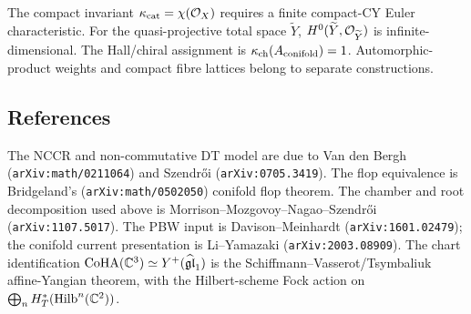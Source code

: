 The compact invariant $\kappa_{\mathrm{cat}}=\chi(\mathcal{O}_X)$ requires a finite compact-CY
Euler characteristic.  For the quasi-projective total space
$\widetilde{Y}$, $H^0(\widetilde{Y},\mathcal{O}_{\widetilde{Y}})$ is
infinite-dimensional.  The Hall/chiral assignment is
$\kappa_{\mathrm{ch}}(A_{\mathrm{conifold}})=1$.  Automorphic-product weights and
compact fibre lattices belong to separate constructions.

\subsection*{References}

The NCCR and non-commutative DT model are due to Van den Bergh
(\texttt{arXiv:math/0211064}) and Szendr\H{o}i
(\texttt{arXiv:0705.3419}).  The flop equivalence is Bridgeland's
(\texttt{arXiv:math/0502050}) conifold flop theorem.  The chamber and
root decomposition used above is Morrison--Mozgovoy--Nagao--Szendr\H{o}i
(\texttt{arXiv:1107.5017}).  The PBW input is Davison--Meinhardt
(\texttt{arXiv:1601.02479}); the conifold current presentation is
Li--Yamazaki (\texttt{arXiv:2003.08909}).  The chart identification
$\mathrm{CoHA}(\mathbb{C}^3)\simeq Y^+(\widehat{\mathfrak{gl}}_1)$ is the
Schiffmann--Vasserot/Tsymbaliuk affine-Yangian theorem, with the
Hilbert-scheme Fock action on
$\bigoplus_n H^*_T(\mathrm{Hilb}^n(\mathbb{C}^2))$.
